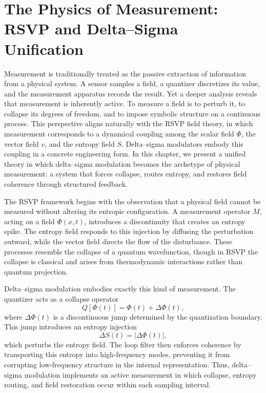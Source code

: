 
\chapter{The Physics of Measurement: RSVP and Delta–Sigma Unification}

Measurement is traditionally treated as the passive extraction of information from a physical system. A sensor samples a field, a quantizer discretizes its value, and the measurement apparatus records the result. Yet a deeper analysis reveals that measurement is inherently active. To measure a field is to perturb it, to collapse its degrees of freedom, and to impose symbolic structure on a continuous process. This perspective aligns naturally with the RSVP field theory, in which measurement corresponds to a dynamical coupling among the scalar field \(\Phi\), the vector field \(v\), and the entropy field \(S\). Delta–sigma modulators embody this coupling in a concrete engineering form. In this chapter, we present a unified theory in which delta–sigma modulation becomes the archetype of physical measurement: a system that forces collapse, routes entropy, and restores field coherence through structured feedback.

The RSVP framework begins with the observation that a physical field cannot be measured without altering its entropic configuration. A measurement operator \(M\), acting on a field \(\Phi(x,t)\), introduces a discontinuity that creates an entropy spike. The entropy field responds to this injection by diffusing the perturbation outward, while the vector field directs the flow of the disturbance. These processes resemble the collapse of a quantum wavefunction, though in RSVP the collapse is classical and arises from thermodynamic interactions rather than quantum projection.

Delta–sigma modulation embodies exactly this kind of measurement. The quantizer acts as a collapse operator
\[
Q[\Phi(t)] = \Phi(t) + \Delta\Phi(t),
\]
where \(\Delta\Phi(t)\) is a discontinuous jump determined by the quantization boundary. This jump introduces an entropy injection
\[
\Delta S(t) = |\Delta\Phi(t)|,
\]
which perturbs the entropy field. The loop filter then enforces coherence by transporting this entropy into high-frequency modes, preventing it from corrupting low-frequency structure in the internal representation. Thus, delta–sigma modulation implements an active measurement in which collapse, entropy routing, and field restoration occur within each sampling interval.

